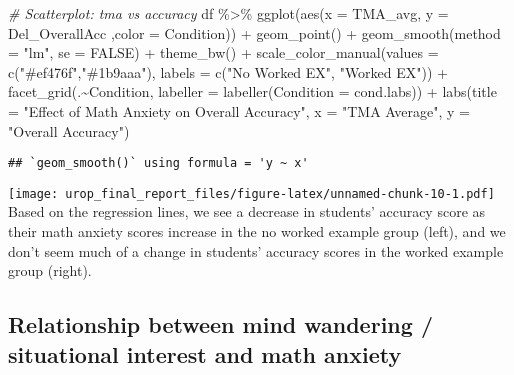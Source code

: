 \documentclass[
]{article}
\newenvironment{Shaded}{\begin{snugshade}}{\end{snugshade}}
\newcommand{\AttributeTok}[1]{\textcolor[rgb]{0.77,0.63,0.00}{#1}}
\newcommand{\CommentTok}[1]{\textcolor[rgb]{0.56,0.35,0.01}{\textit{#1}}}
\newcommand{\ConstantTok}[1]{\textcolor[rgb]{0.00,0.00,0.00}{#1}}
\newcommand{\FunctionTok}[1]{\textcolor[rgb]{0.00,0.00,0.00}{#1}}
\newcommand{\NormalTok}[1]{#1}
\newcommand{\SpecialCharTok}[1]{\textcolor[rgb]{0.00,0.00,0.00}{#1}}
\newcommand{\StringTok}[1]{\textcolor[rgb]{0.31,0.60,0.02}{#1}}
\begin{document}
\begin{Shaded}
\begin{Highlighting}[]
\CommentTok{\# Scatterplot: tma vs accuracy}
\NormalTok{df }\SpecialCharTok{\%\textgreater{}\%} 
  \FunctionTok{ggplot}\NormalTok{(}\FunctionTok{aes}\NormalTok{(}\AttributeTok{x =}\NormalTok{ TMA\_avg, }\AttributeTok{y =}\NormalTok{ Del\_OverallAcc ,}\AttributeTok{color  =}\NormalTok{ Condition)) }\SpecialCharTok{+} 
  \FunctionTok{geom\_point}\NormalTok{() }\SpecialCharTok{+}
  \FunctionTok{geom\_smooth}\NormalTok{(}\AttributeTok{method =} \StringTok{"lm"}\NormalTok{, }\AttributeTok{se =} \ConstantTok{FALSE}\NormalTok{) }\SpecialCharTok{+}
  \FunctionTok{theme\_bw}\NormalTok{() }\SpecialCharTok{+} 
  \FunctionTok{scale\_color\_manual}\NormalTok{(}\AttributeTok{values =} \FunctionTok{c}\NormalTok{(}\StringTok{"\#ef476f"}\NormalTok{,}\StringTok{"\#1b9aaa"}\NormalTok{), }\AttributeTok{labels =} 
                                  \FunctionTok{c}\NormalTok{(}\StringTok{"No Worked EX"}\NormalTok{, }\StringTok{"Worked EX"}\NormalTok{)) }\SpecialCharTok{+}
  \FunctionTok{facet\_grid}\NormalTok{(.}\SpecialCharTok{\textasciitilde{}}\NormalTok{Condition, }\AttributeTok{labeller =} \FunctionTok{labeller}\NormalTok{(}\AttributeTok{Condition =}\NormalTok{ cond.labs))  }\SpecialCharTok{+}
  \FunctionTok{labs}\NormalTok{(}\AttributeTok{title =} \StringTok{"Effect of Math Anxiety on Overall Accuracy"}\NormalTok{,}
                              \AttributeTok{x =} \StringTok{"TMA Average"}\NormalTok{, }\AttributeTok{y =} \StringTok{"Overall Accuracy"}\NormalTok{)}
\end{Highlighting}
\end{Shaded}

\begin{verbatim}
## `geom_smooth()` using formula = 'y ~ x'
\end{verbatim}

\texttt{[image: urop\_final\_report\_files/figure-latex/unnamed-chunk-10-1.pdf]}
Based on the regression lines, we see a decrease in students' accuracy
score as their math anxiety scores increase in the no worked example
group (left), and we don't seem much of a change in students' accuracy
scores in the worked example group (right).

\hypertarget{relationship-between-mind-wandering-situational-interest-and-math-anxiety}{%
\subsection{Relationship between mind wandering / situational interest
and math
anxiety}\label{relationship-between-mind-wandering-situational-interest-and-math-anxiety}}
\end{document}
